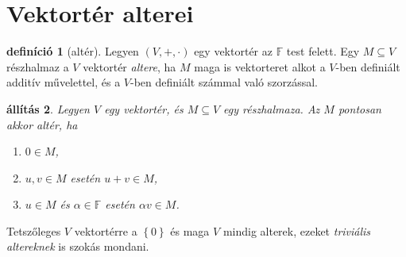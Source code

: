 \documentclass[9pt, showtrims]{memoir}
\theoremstyle{plain}
\newtheorem{proposition}{állítás}[section]
\theoremstyle{remark}
\theoremstyle{definition}
\newtheorem{definition}[proposition]{definíció}
\renewcommand{\mathbf}{\mathbb}
\begin{document}
\section{Vektortér alterei}
\begin{definition}[altér]
    Legyen $\left( V,+,\cdot \right)$ egy vektortér az $\mathbf{F}$ test felett.
    Egy $M\subseteq V$ részhalmaz a $V$ vektortér \emph{altere},
    ha $M$ maga is vektorteret alkot a $V$-ben definiált additív művelettel, 
    és a $V$-ben definiált számmal való szorzással.
\end{definition}
\begin{proposition}
    Legyen $V$ egy vektortér, és $M\subseteq V$ egy részhalmaza.
    Az $M$ pontosan akkor altér,
    ha
    \begin{enumerate}
        \item $0\in M$,
        \item $u,v\in M$ esetén $u+v\in M$,
        \item $u\in M$ és $\alpha\in\mathbf{F}$ esetén $\alpha v\in M$.\qedhere
    \end{enumerate}
\end{proposition}
Tetszőleges $V$ vektortérre a $\left\{ 0 \right\}$ és maga $V$ mindig alterek,
ezeket \emph{triviális altereknek} is szokás mondani.
\end{document}
